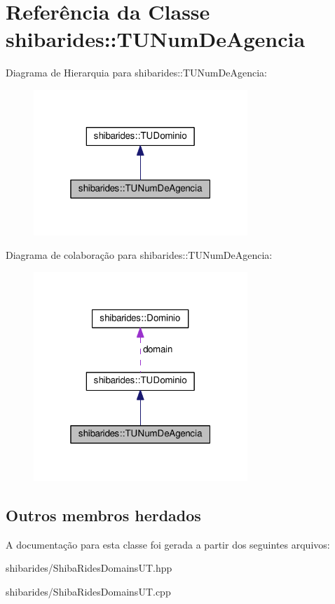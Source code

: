 \hypertarget{classshibarides_1_1TUNumDeAgencia}{}\section{Referência da Classe shibarides\+:\+:T\+U\+Num\+De\+Agencia}
\label{classshibarides_1_1TUNumDeAgencia}


Diagrama de Hierarquia para shibarides\+:\+:T\+U\+Num\+De\+Agencia\+:\nopagebreak
\begin{figure}[H]
\begin{center}
\leavevmode
\includegraphics[width=229pt]{classshibarides_1_1TUNumDeAgencia__inherit__graph}
\end{center}
\end{figure}


Diagrama de colaboração para shibarides\+:\+:T\+U\+Num\+De\+Agencia\+:\nopagebreak
\begin{figure}[H]
\begin{center}
\leavevmode
\includegraphics[width=229pt]{classshibarides_1_1TUNumDeAgencia__coll__graph}
\end{center}
\end{figure}
\subsection*{Outros membros herdados}


A documentação para esta classe foi gerada a partir dos seguintes arquivos\+:\begin{DoxyCompactItemize}
\item 
shibarides/Shiba\+Rides\+Domains\+U\+T.\+hpp\item 
shibarides/Shiba\+Rides\+Domains\+U\+T.\+cpp\end{DoxyCompactItemize}
